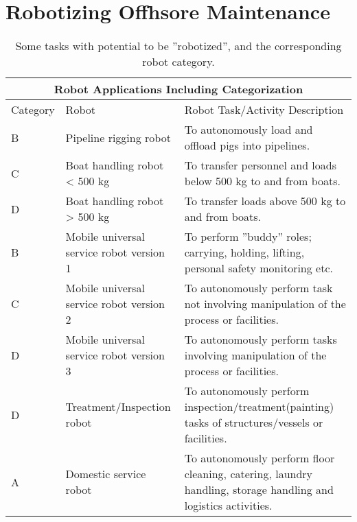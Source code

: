 

\section{Robotizing Offhsore Maintenance}




\begin{table}
\centering
\begin{tabular}{ |p{2cm} p{3cm} p{5cm}| }
\hline
\multicolumn{3}{|c|}{Robot Applications Including Categorization}\\
\hline\hline
Category & Robot & Robot Task/Activity Description \\ 
\hline
B & Pipeline rigging robot & To autonomously load and offload pigs into pipelines. \\
C & Boat handling robot < 500 kg & To transfer personnel and loads below 500 kg to and from boats.\\
D & Boat handling robot > 500 kg & To transfer loads above 500 kg to and from boats.\\
\hline
B & Mobile universal service robot version 1 & To perform ''buddy'' roles; carrying, holding, lifting, personal safety monitoring etc. \\
C & Mobile universal service robot version 2 & To autonomously perform task not involving manipulation of the process or facilities.\\
D & Mobile universal service robot version 3 & To autonomously perform tasks involving manipulation of the process or facilities. \\
D & Treatment/Inspection robot & To autonomously perform inspection/treatment(painting) tasks of structures/vessels or facilities.\\
\hline
A & Domestic service robot & To autonomously perform floor cleaning, catering, laundry handling, storage handling and logistics activities. \\
\hline\hline 
\end{tabular}
\caption{Some tasks with potential to be ''robotized'', and the corresponding robot category\cite{6094661}.} 
\label{tab:tasks_capabilities}
\end{table}

